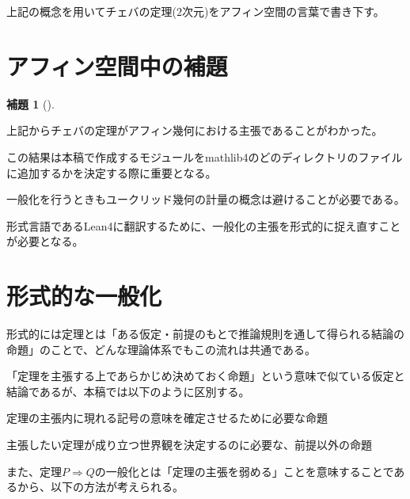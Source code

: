 \documentclass[a4paper,12pt]{bxjsbook}
\newlength{\customindent}
\newenvironment{body}{
  \par
  \begingroup
  \setlength{\leftskip}{\customindent}
  \setlength{\rightskip}{0pt}
  \setlength{\parindent}{1em}
  \setlength{\displayindent}{\customindent}
  \setlength{\displaywidth}{\dimexpr\linewidth-\customindent\relax}
}{
  \par
  \endgroup
}
\theoremstyle{theorem}
\newtheorem{lemma}[theorem]{補題}
\begin{document}
  \begin{body}
    \indent 上記の概念を用いてチェバの定理($2$次元)をアフィン空間の言葉で書き下す。
  \end{body}

  \section{アフィン空間中の補題}
  \begin{lemma}[]
  \end{lemma}
  




















    \begin{body}
      \indent 上記からチェバの定理がアフィン幾何における主張であることがわかった。

      \indent この結果は本稿で作成するモジュールをmathlib4のどのディレクトリのファイルに追加するかを決定する際に重要となる。

      \indent 一般化を行うときもユークリッド幾何の計量の概念は避けることが必要である。

    \end{body}



    \begin{body}
        \indent 形式言語であるLean4に翻訳するために、一般化の主張を形式的に捉え直すことが必要となる。
    \end{body}

    \section{形式的な一般化}


    \begin{body}
        \indent 形式的には定理とは「ある仮定・前提のもとで推論規則を通して得られる結論の命題」のことで、どんな理論体系でもこの流れは共通である。

        \indent 「定理を主張する上であらかじめ決めておく命題」という意味で似ている仮定と結論であるが、本稿では以下のように区別する。

        \begin{bodydescription}[leftmargin=5em, style=nextline]
            \item[\hspace*{2em}前提] 定理の主張内に現れる記号の意味を確定させるために必要な命題
            \item[\hspace*{2em}仮定] 主張したい定理が成り立つ世界観を決定するのに必要な、前提以外の命題
        \end{bodydescription}

        \indent また、定理$P⇒Q$の一般化とは「定理の主張を弱める」ことを意味することであるから、以下の方法が考えられる。
    \end{body}
\end{document}
